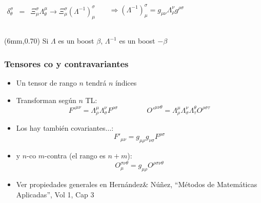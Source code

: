 \documentclass[xetex,mathserif,serif,10pt]{beamer}
\begin{document}
\begin{frame}
\begin{itemize}
\begin{columns}
\begin{eqnarray}
          \delta^{\sigma}_{\theta}  &=& \Xi_\mu^\sigma \Lambda^{\mu}_{\theta} \to \Xi_\mu^\sigma \left (\Lambda^{-1} \right )^\sigma_\mu \nonumber
        \end{eqnarray}
        \vspace{-2.0em}
        \begin{exampleblock}{}
          \begin{equation}
            \Rightarrow \left (\Lambda^{-1} \right )^\sigma_\mu = g_{\mu\nu} \Lambda^{\nu}_{\rho} g^{\rho\sigma}
          \end{equation}
        \end{exampleblock}
      \end{columns}
  \end{itemize}
  \begin{textblock*}{30mm}(6mm,0.70\textheight)
    \small{\alert{Si $\Lambda$ es un boost $\beta$, $\Lambda^{-1}$ es un boost $-\beta$}}
  \end{textblock*}
\end{frame}

\begin{frame}
  \frametitle{Tensores co y contravariantes}
  \begin{itemize}
    \item Un tensor de rango $n$ tendrá $n$ índices
    \item Transforman según $n$ TL:
      \[ F'^{\mu\nu} = \Lambda^{\mu}_{\rho} \Lambda^{\nu}_{\sigma} F^{\rho\sigma} \qquad \qquad 
      O'^{\mu\nu\theta} = \Lambda^{\mu}_{\rho} \Lambda^{\nu}_{\sigma} \Lambda^{\theta}_{\tau} O^{\rho\sigma\tau} \]
    \item Los hay también covariantes$\ldots$:
      \[ F'_{\mu\nu} = g_{\mu\rho} g_{\nu\sigma} F^{\rho\sigma} \]
    \item y $n$-co $m$-contra (el rango es $n+m$): 
      \[O_\mu^{\sigma\nu\theta} =  g_{\mu\rho} O^{\rho\sigma\nu\theta} \]
    \item Ver propiedades generales en Hernández\& Núñez, ``Métodos de Matemáticas Aplicadas'', Vol 1, Cap 3
  \end{itemize}
\end{frame}
\end{document}
